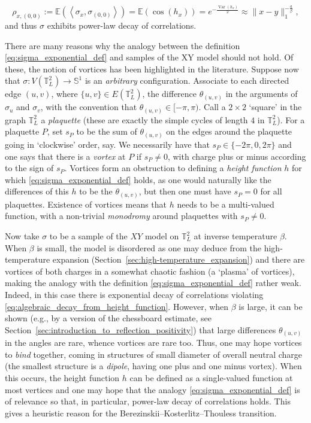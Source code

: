 \documentclass[12pt,reqno]{article}
\def\E{\mathbb{E}}
\def\T{\mathbb{T}}
\DeclareMathOperator{\var}{Var}
\begin{document}
\begin{equation}\label{eq:algebraic_decay_from_height_function}
  \rho_{x,(0,0)}:=\E(\left\langle\sigma_x,\sigma_{(0,0)}\right\rangle) = \E(\cos(h_x)) = e^{-\frac{\var(h_x)}{2}} \approx \|x-y\|_1^{-\frac{a}{\beta}},
\end{equation}
and thus $\sigma$ exhibits power-law decay of correlations.

There are many reasons why the analogy between the definition \eqref{eq:sigma_exponential_def} and samples of the XY model should not hold. Of these, the notion of vortices has been highlighted in the literature. Suppose now that $\sigma:V(\T_L^2)\to\mathbb S^1$ is an \emph{arbitrary} configuration. Associate to each directed edge $(u,v)$, where $\{u,v\}\in E(\T_L^2)$, the difference $\theta_{(u,v)}$ in the arguments of $\sigma_u$ and $\sigma_v$, with the convention that $\theta_{(u,v)} \in [-\pi, \pi)$. Call a $2\times 2$ `square' in the graph $\T_L^2$ a \emph{plaquette} (these are exactly the simple cycles of length $4$ in $\T_L^2$). For a plaquette $P$, set $s_P$ to be the sum of $\theta_{(u,v)}$ on the edges around the plaquette going in `clockwise' order, say. We necessarily have that $s_P\in\{-2\pi, 0,2\pi\}$ and one says that there is a \emph{vortex} at $P$ if $s_P\neq 0$, with charge plus or minus according to the sign of $s_P$. Vortices form an obstruction to defining a \emph{height function} $h$ for which \eqref{eq:sigma_exponential_def} holds, as one would naturally like the differences of this $h$ to be the $\theta_{(u,v)}$, but then one must have $s_P = 0$ for all plaquettes. Existence of vortices means that $h$ needs to be a multi-valued function, with a non-trivial \emph{monodromy} around plaquettes with $s_P\neq 0$.

Now take $\sigma$ to be a sample of the $XY$ model on $\T_L^2$ at
inverse temperature $\beta$. When $\beta$ is small, the model is
disordered as one may deduce from the high-temperature expansion
(Section~\ref{sec:high-temperature_expansion}) and there are
vortices of both charges in a somewhat chaotic fashion (a `plasma'
of vortices), making the analogy with the definition
\eqref{eq:sigma_exponential_def} rather weak. Indeed, in this case
there is exponential decay of correlations violating
\eqref{eq:algebraic_decay_from_height_function}. However, when
$\beta$ is large, it can be shown (e.g., by a version of the chessboard
estimate, see Section~\ref{sec:introduction_to_reflection_positivity}) that large differences $\theta_{(u,v)}$ in the angles are
rare, whence vortices are rare too. Thus, one may hope vortices to
\emph{bind} together, coming in structures of small diameter of
overall neutral charge (the smallest structure is a \emph{dipole},
having one plus and one minus vortex). When this occurs, the height
function $h$ can be defined as a single-valued function at most
vertices and one may hope that the analogy
\eqref{eq:sigma_exponential_def} is of relevance so that, in
particular, power-law decay of correlations holds. This gives a
heuristic reason for the Berezinskii--Kosterlitz--Thouless transition.
\end{document}
